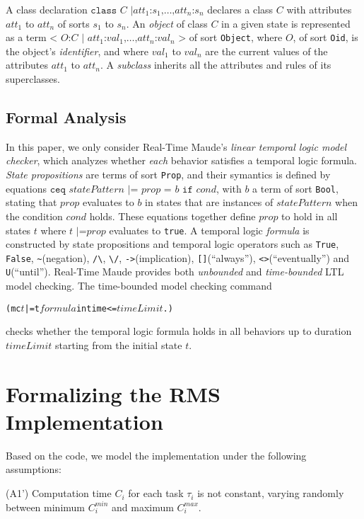 \documentclass{llncs}
\begin{document}
A class declaration $\texttt{class }C\texttt{ |
}att_1\texttt{:}s_1\texttt{,}\ldots\texttt{,}att_n\texttt{:}s_n$
declares a class $C$ with attributes $att_1$ to $att_n$ of sorts $s_1$
to $s_n$. An \emph{object} of class $C$ in a given state is
represented as a term $\texttt{< } O\texttt{:} C \texttt{ | }
att_1\texttt{:}val_1\texttt{,} \ldots
\texttt{,}att_n\texttt{:}val_n\texttt{ >}$ of sort \verb|Object|,
where $O$, of sort \verb|Oid|, is the object's \emph{identifier}, and
where $val_1$ to $val_n$ are the current values of the attributes
$att_1$ to $att_n$. A \emph{subclass} inherits all the attributes and
rules of its superclasses.

\subsection{Formal Analysis}
In this paper, we only consider Real-Time Maude's \emph{linear
  temporal logic model checker}, which analyzes whether \emph{each}
behavior satisfies a temporal logic formula. \emph{State propositions}
are terms of sort \verb|Prop|, and their symantics is defined by
equations $\texttt{ceq } statePattern \texttt{ |= } prop \texttt{ = }
b \texttt{ if } cond$, with $b$ a term of sort \verb|Bool|, stating
that $prop$ evaluates to $b$ in states that are instances of
$statePattern$ when the condition $cond$ holds. These equations
together define $prop$ to hold in all states $t$ where $t \texttt{ |=
} prop$ evaluates to \verb|true|. A temporal logic \emph{formula} is
constructed by state propositions and temporal logic operators such as
\verb|True|, \verb|False|, \verb|~|(negation), \verb|/\|, \verb|\/|,
\verb|->|(implication), \verb|[]|(``always''),
\verb|<>|(``eventually'') and \verb|U|(``until''). Real-Time Maude
provides both \emph{unbounded} and \emph{time-bounded} LTL model
checking. The time-bounded model checking command
\begin{alltt}
  (mc \(t\) |=t \(formula\) in time <= \(timeLimit\) .)
\end{alltt}
checks whether the temporal logic formula holds in all behaviors up to
duration $timeLimit$ starting from the initial state $t$.

\section{Formalizing the RMS Implementation}
Based on the code, we model the implementation under the following
assumptions:

(A1') Computation time $C_i$ for each task $\tau_i$ is not constant,
varying randomly between minimum $C^{min}_i$ and maximum $C^{max}_i$.
\end{document}
